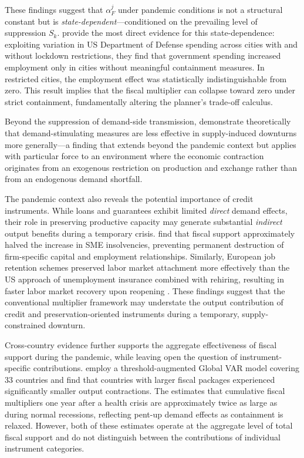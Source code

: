 These findings suggest that $\alpha_F^j$ under pandemic conditions is not a structural constant but is \textit{state-dependent}---conditioned on the prevailing level of suppression $S_k$. \cite{auerbach2022} provide the most direct evidence for this state-dependence: exploiting variation in US Department of Defense spending across cities with and without lockdown restrictions, they find that government spending increased employment only in cities without meaningful containment measures. In restricted cities, the employment effect was statistically indistinguishable from zero. This result implies that the fiscal multiplier can collapse toward zero under strict containment, fundamentally altering the planner's trade-off calculus.

Beyond the suppression of demand-side transmission, \cite{ghassibe2021} demonstrate theoretically that demand-stimulating measures are less effective in supply-induced downturns more generally---a finding that extends beyond the pandemic context but applies with particular force to an environment where the economic contraction originates from an exogenous restriction on production and exchange rather than from an endogenous demand shortfall.

The pandemic context also reveals the potential importance of credit instruments. While loans and guarantees exhibit limited \textit{direct} demand effects, their role in preserving productive capacity may generate substantial \textit{indirect} output benefits during a temporary crisis. \cite{gourinchas2021} find that fiscal support approximately halved the increase in SME insolvencies, preventing permanent destruction of firm-specific capital and employment relationships. Similarly, European job retention schemes preserved labor market attachment more effectively than the US approach of unemployment insurance combined with rehiring, resulting in faster labor market recovery upon reopening \citep{aum2021}. These findings suggest that the conventional multiplier framework may understate the output contribution of credit and preservation-oriented instruments during a temporary, supply-constrained downturn.

Cross-country evidence further supports the aggregate effectiveness of fiscal support during the pandemic, while leaving open the question of instrument-specific contributions. \cite{chudik2021} employ a threshold-augmented Global VAR model covering 33 countries and find that countries with larger fiscal packages experienced significantly smaller output contractions. The \cite{imf2022fiscal} estimates that cumulative fiscal multipliers one year after a health crisis are approximately twice as large as during normal recessions, reflecting pent-up demand effects as containment is relaxed. However, both of these estimates operate at the aggregate level of total fiscal support and do not distinguish between the contributions of individual instrument categories.

